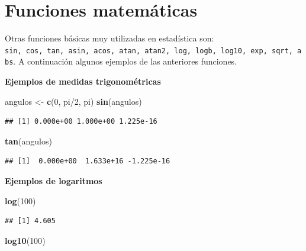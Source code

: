 \documentclass[10pt,]{krantz}
\makeatletter
\newenvironment{Shaded}{\begin{snugshade}}{\end{snugshade}}
\newcommand{\KeywordTok}[1]{\textcolor[rgb]{0.13,0.29,0.53}{\textbf{{#1}}}}
\newcommand{\DecValTok}[1]{\textcolor[rgb]{0.00,0.00,0.81}{{#1}}}
\newcommand{\StringTok}[1]{\textcolor[rgb]{0.31,0.60,0.02}{{#1}}}
\newcommand{\NormalTok}[1]{{#1}}
\newenvironment{kframe}{%
\medskip{}
\setlength{\fboxsep}{.8em}
 \def\at@end@of@kframe{}%
 \ifinner\ifhmode%
  \def\at@end@of@kframe{\end{minipage}}%
  \begin{minipage}{\columnwidth}%
 \fi\fi%
 \def\FrameCommand##1{\hskip\@totalleftmargin \hskip-\fboxsep
 \colorbox{shadecolor}{##1}\hskip-\fboxsep
     \hskip-\linewidth \hskip-\@totalleftmargin \hskip\columnwidth}%
 \MakeFramed {\advance\hsize-\width
   \@totalleftmargin\z@ \linewidth\hsize
   \@setminipage}}%
 {\par\unskip\endMakeFramed%
 \at@end@of@kframe}
\renewenvironment{Shaded}{\begin{kframe}}{\end{kframe}}
\makeatother
\begin{document}
\section{Funciones matemáticas}\label{funciones-matematicas}

Otras funciones básicas muy utilizadas en estadística son:
\texttt{sin,\ cos,\ tan,\ asin,\ acos,\ atan,\ atan2,\ log,\ logb,\ log10,\ exp,\ sqrt,\ abs}.
A continuación algunos ejemplos de las anteriores funciones.

\textbf{Ejemplos de medidas trigonométricas}

\begin{Shaded}
\begin{Highlighting}[]
\NormalTok{angulos <-}\StringTok{ }\KeywordTok{c}\NormalTok{(}\DecValTok{0}\NormalTok{, pi/}\DecValTok{2}\NormalTok{, pi)}
\KeywordTok{sin}\NormalTok{(angulos)}
\end{Highlighting}
\end{Shaded}

\begin{verbatim}
## [1] 0.000e+00 1.000e+00 1.225e-16
\end{verbatim}

\begin{Shaded}
\begin{Highlighting}[]
\KeywordTok{tan}\NormalTok{(angulos)}
\end{Highlighting}
\end{Shaded}

\begin{verbatim}
## [1]  0.000e+00  1.633e+16 -1.225e-16
\end{verbatim}

\textbf{Ejemplos de logaritmos}

\begin{Shaded}
\begin{Highlighting}[]
\KeywordTok{log}\NormalTok{(}\DecValTok{100}\NormalTok{)}
\end{Highlighting}
\end{Shaded}

\begin{verbatim}
## [1] 4.605
\end{verbatim}

\begin{Shaded}
\begin{Highlighting}[]
\KeywordTok{log10}\NormalTok{(}\DecValTok{100}\NormalTok{)}
\end{Highlighting}
\end{Shaded}
\end{document}

